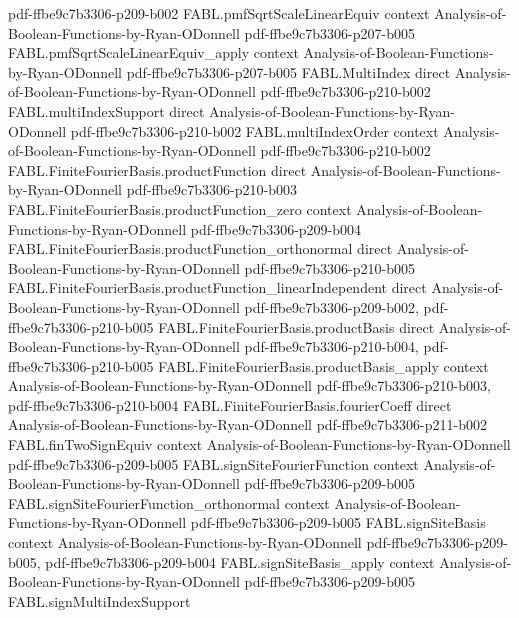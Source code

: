 \begin{theorem}
  {pdf-ffbe9c7b3306-p209-b002}
\proofstep
  {FABL.pmfSqrtScaleLinearEquiv}
  {context}
  {Analysis-of-Boolean-Functions-by-Ryan-ODonnell}
  {pdf-ffbe9c7b3306-p207-b005}
\proofstep
  {FABL.pmfSqrtScaleLinearEquiv_apply}
  {context}
  {Analysis-of-Boolean-Functions-by-Ryan-ODonnell}
  {pdf-ffbe9c7b3306-p207-b005}
\proofstep
  {FABL.MultiIndex}
  {direct}
  {Analysis-of-Boolean-Functions-by-Ryan-ODonnell}
  {pdf-ffbe9c7b3306-p210-b002}
\proofstep
  {FABL.multiIndexSupport}
  {direct}
  {Analysis-of-Boolean-Functions-by-Ryan-ODonnell}
  {pdf-ffbe9c7b3306-p210-b002}
\proofstep
  {FABL.multiIndexOrder}
  {context}
  {Analysis-of-Boolean-Functions-by-Ryan-ODonnell}
  {pdf-ffbe9c7b3306-p210-b002}
\proofstep
  {FABL.FiniteFourierBasis.productFunction}
  {direct}
  {Analysis-of-Boolean-Functions-by-Ryan-ODonnell}
  {pdf-ffbe9c7b3306-p210-b003}
\proofstep
  {FABL.FiniteFourierBasis.productFunction_zero}
  {context}
  {Analysis-of-Boolean-Functions-by-Ryan-ODonnell}
  {pdf-ffbe9c7b3306-p209-b004}
\proofstep
  {FABL.FiniteFourierBasis.productFunction_orthonormal}
  {direct}
  {Analysis-of-Boolean-Functions-by-Ryan-ODonnell}
  {pdf-ffbe9c7b3306-p210-b005}
\proofstep
  {FABL.FiniteFourierBasis.productFunction_linearIndependent}
  {direct}
  {Analysis-of-Boolean-Functions-by-Ryan-ODonnell}
  {pdf-ffbe9c7b3306-p209-b002,
    pdf-ffbe9c7b3306-p210-b005}
\proofstep
  {FABL.FiniteFourierBasis.productBasis}
  {direct}
  {Analysis-of-Boolean-Functions-by-Ryan-ODonnell}
  {pdf-ffbe9c7b3306-p210-b004,
    pdf-ffbe9c7b3306-p210-b005}
\proofstep
  {FABL.FiniteFourierBasis.productBasis_apply}
  {context}
  {Analysis-of-Boolean-Functions-by-Ryan-ODonnell}
  {pdf-ffbe9c7b3306-p210-b003,
    pdf-ffbe9c7b3306-p210-b004}
\proofstep
  {FABL.FiniteFourierBasis.fourierCoeff}
  {direct}
  {Analysis-of-Boolean-Functions-by-Ryan-ODonnell}
  {pdf-ffbe9c7b3306-p211-b002}
\proofstep
  {FABL.finTwoSignEquiv}
  {context}
  {Analysis-of-Boolean-Functions-by-Ryan-ODonnell}
  {pdf-ffbe9c7b3306-p209-b005}
\proofstep
  {FABL.signSiteFourierFunction}
  {context}
  {Analysis-of-Boolean-Functions-by-Ryan-ODonnell}
  {pdf-ffbe9c7b3306-p209-b005}
\proofstep
  {FABL.signSiteFourierFunction_orthonormal}
  {context}
  {Analysis-of-Boolean-Functions-by-Ryan-ODonnell}
  {pdf-ffbe9c7b3306-p209-b005}
\proofstep
  {FABL.signSiteBasis}
  {context}
  {Analysis-of-Boolean-Functions-by-Ryan-ODonnell}
  {pdf-ffbe9c7b3306-p209-b005,
    pdf-ffbe9c7b3306-p209-b004}
\proofstep
  {FABL.signSiteBasis_apply}
  {context}
  {Analysis-of-Boolean-Functions-by-Ryan-ODonnell}
  {pdf-ffbe9c7b3306-p209-b005}
\proofstep
  {FABL.signMultiIndexSupport}

\end{theorem}
